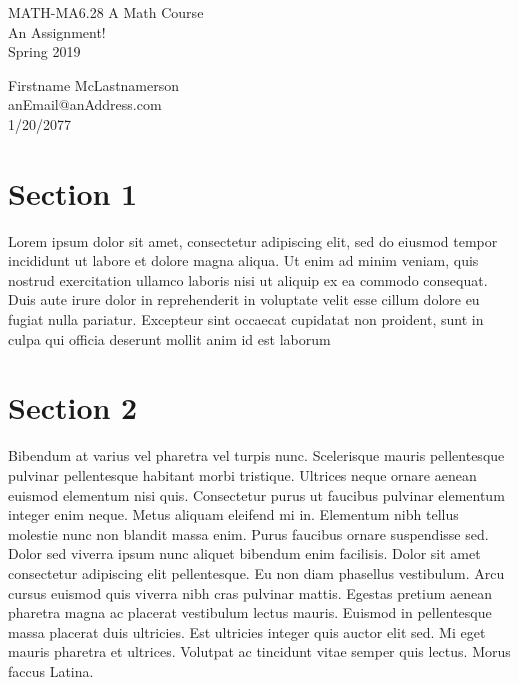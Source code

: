 \documentclass{article}
\begin{document}
\newcommand{\bigma}[2]{\sum_{#1}^{#2}}

\newcommand{\vecr}{\mathbf{r}}
\newcommand{\vecu}{\mathbf{u}}
\newcommand{\vecv}{\mathbf{v}}
\newcommand{\vecw}{\mathbf{w}}
\newcommand{\vecx}{\mathbf{x}}
\newcommand{\vecy}{\mathbf{y}}
\newcommand{\vecz}{\mathbf{z}}
\newcommand{\yhat}{\hat{\vecy}}


\newcommand{\transpose}[1]{#1^T}
\newcommand{\norm}[1]{\lVert#1\rVert}
\newcommand{\dist}[2]{\text{dist($\mathbf{#1}$,$\mathbf{#2}$)}}



\begin{center}
MATH-MA6.28 A Math Course \\
An Assignment! \\
Spring 2019 \\
\end{center}




\begin{flushright}
Firstname McLastnamerson\\  %
anEmail@anAddress.com \\
1/20/2077			 %

\end{flushright}

\section{Section 1}

Lorem ipsum dolor sit amet, consectetur adipiscing elit, sed do eiusmod tempor incididunt ut labore et dolore magna aliqua. Ut enim ad minim veniam, quis nostrud exercitation ullamco laboris nisi ut aliquip ex ea commodo consequat. Duis aute irure dolor in reprehenderit in voluptate velit esse cillum dolore eu fugiat nulla pariatur. Excepteur sint occaecat cupidatat non proident, sunt in culpa qui officia deserunt mollit anim id est laborum


\section{Section 2}

Bibendum at varius vel pharetra vel turpis nunc. Scelerisque mauris pellentesque pulvinar pellentesque habitant morbi tristique. Ultrices neque ornare aenean euismod elementum nisi quis. Consectetur purus ut faucibus pulvinar elementum integer enim neque. Metus aliquam eleifend mi in. Elementum nibh tellus molestie nunc non blandit massa enim. Purus faucibus ornare suspendisse sed. Dolor sed viverra ipsum nunc aliquet bibendum enim facilisis. Dolor sit amet consectetur adipiscing elit pellentesque. Eu non diam phasellus vestibulum. Arcu cursus euismod quis viverra nibh cras pulvinar mattis. Egestas pretium aenean pharetra magna ac placerat vestibulum lectus mauris. Euismod in pellentesque massa placerat duis ultricies. Est ultricies integer quis auctor elit sed. Mi eget mauris pharetra et ultrices. Volutpat ac tincidunt vitae semper quis lectus.  Morus faccus Latina. \cite{a_web_site}
\end{document}
